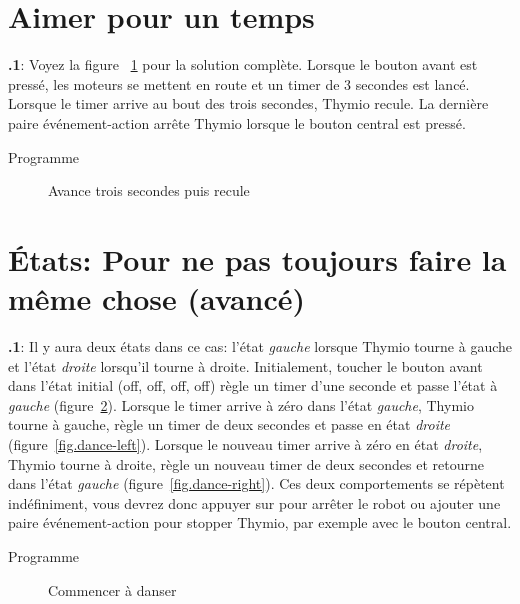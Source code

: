 \documentclass[12pt,a4paper,english]{article}
\begin{document}
\section{Aimer pour un temps}

\textbf{\thesection.1}:
Voyez la figure ~\ref{fig.three} pour la solution complète. Lorsque le bouton avant est pressé, les moteurs se mettent en route et un timer de 3 secondes est lancé. Lorsque le timer arrive au bout des trois secondes, Thymio recule. La dernière paire événement-action arrête Thymio lorsque le bouton central est pressé.

{\raggedleft \hfill Programme }


\begin{figure}[hbt]
\begin{center}
\caption{Avance trois secondes puis recule}\label{fig.three}
\end{center}
\end{figure}


\section{États: Pour ne pas toujours faire la même chose (avancé)}

\textbf{\thesection.1}:
Il y aura deux états dans ce cas: l'état \emph{gauche}  lorsque Thymio tourne à gauche et l'état \emph{droite}  lorsqu'il tourne à droite. Initialement, toucher le bouton avant dans l'état initial (off, off, off, off) règle un timer d'une seconde et passe l'état à \emph{gauche} (figure~\ref{fig.dance-start}). Lorsque le timer arrive à zéro dans l'état \emph{gauche}, Thymio tourne à gauche, règle un timer de deux secondes et passe en état \emph{droite} (figure~\ref{fig.dance-left}). Lorsque le nouveau timer arrive à zéro en état \emph{droite}, Thymio tourne à droite, règle un nouveau timer de deux secondes et retourne dans l'état \emph{gauche} (figure~\ref{fig.dance-right}). Ces deux comportements se répètent indéfiniment, vous devrez donc appuyer sur  pour arrêter le robot ou ajouter une paire événement-action pour stopper Thymio, par exemple avec le bouton central.

{\raggedleft \hfill Programme }


\begin{figure}
\begin{center}
\caption{Commencer à danser}\label{fig.dance-start}
\end{center}
\end{figure}
\end{document}
